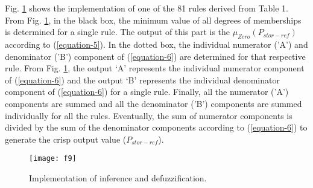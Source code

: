 Fig. \ref{sec4_f9} shows the implementation of one of the 81 rules derived from Table 1. From Fig. \ref{sec4_f9}, in the black box, the minimum value of all degrees of memberships is determined for a single rule. The output of this part is the $\mu_{Zero}(P_{stor-ref})$ according to (\ref{equation-5}). In the dotted box, the individual numerator ('A') and denominator ('B') component of (\ref{equation-6}) are determined for that respective rule. From Fig. \ref{sec4_f9}, the output ‘A’ represents the individual numerator component of (\ref{equation-6}) and the output ‘B’ represents the individual denominator component of (\ref{equation-6}) for a single rule. Finally, all the numerator ('A') components are summed and all the denominator ('B') components are summed individually for all the rules. Eventually, the sum of numerator components is divided by the sum of the denominator components according to (\ref{equation-6}) to generate the crisp output value ($P_{stor-ref}$). 
\begin{figure}[ht!]
\centering
\texttt{[image: f9]}
\caption{Implementation of inference and defuzzification.}
\label{sec4_f9}
\end{figure}
